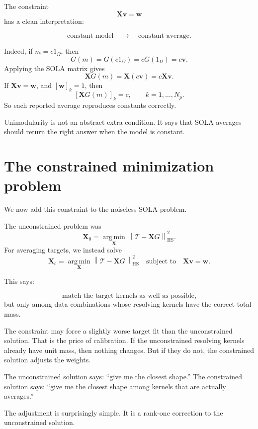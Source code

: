 \documentclass[11pt,openany]{book}
\theoremstyle{definition}
\theoremstyle{remark}
\newcommand{\Tau}{\mathcal{T}}
\newcommand{\HS}{\mathrm{HS}}
\newcommand{\argmin}{\operatorname*{arg\,min}}
\begin{document}
The constraint
\[
  \mathbf X\mathbf v=\mathbf w
\]
has a clean interpretation:

\[
  \text{constant model}
  \quad\longmapsto\quad
  \text{constant average}.
\]

Indeed, if \(m=c1_\Omega\), then
\[
  G(m)=G(c1_\Omega)=cG(1_\Omega)=c\mathbf v.
\]
Applying the SOLA matrix gives
\[
  \mathbf XG(m)=\mathbf X(c\mathbf v)=c\mathbf X\mathbf v.
\]
If \(\mathbf X\mathbf v=\mathbf w\), and \([\mathbf w]_k=1\), then
\[
  [\mathbf XG(m)]_k=c,
  \qquad k=1,\dots,N_p.
\]
So each reported average reproduces constants correctly.

\begin{checkpointbox}
Unimodularity is not an abstract extra condition. It says that SOLA averages should return the
right answer when the model is constant.
\end{checkpointbox}

\section{The constrained minimization problem}

We now add this constraint to the noiseless SOLA problem.

The unconstrained problem was
\[
  \mathbf X_0
  =
  \argmin_{\mathbf X}
  \left\|
    \Tau-\mathbf XG
  \right\|_{\HS}^2.
\]
For averaging targets, we instead solve
\[
  \mathbf X_c
  =
  \argmin_{\mathbf X}
  \left\|
    \Tau-\mathbf XG
  \right\|_{\HS}^2
  \quad
  \text{subject to}
  \quad
  \mathbf X\mathbf v=\mathbf w.
\]

This says:

\[
  \text{match the target kernels as well as possible,}
\]
but only among data combinations whose resolving kernels have the correct total mass.

The constraint may force a slightly worse target fit than the unconstrained solution. That is the
price of calibration. If the unconstrained resolving kernels already have unit mass, then nothing
changes. But if they do not, the constrained solution adjusts the weights.

\begin{intuitionbox}
The unconstrained solution says: ``give me the closest shape.'' The constrained solution says:
``give me the closest shape among kernels that are actually averages.''
\end{intuitionbox}

The adjustment is surprisingly simple. It is a rank-one correction to the unconstrained solution.
\end{document}
